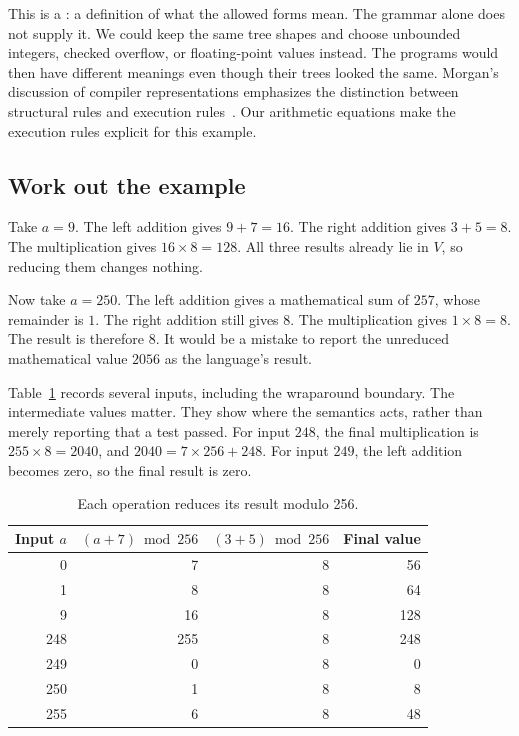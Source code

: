This is a : a definition of what the allowed forms mean.
The grammar alone does not supply it.
We could keep the same tree shapes and choose unbounded integers, checked overflow, or floating-point values instead.
The programs would then have different meanings even though their trees looked the same.
Morgan's discussion of compiler representations emphasizes the distinction between structural rules and execution rules~\cite[Chapter~4]{morgan-1998-optimizing}.
Our arithmetic equations make the execution rules explicit for this example.

\subsection{Work out the example}
\label{sec:tiny-worked-values}

Take $a=9$.
The left addition gives $9+7=16$.
The right addition gives $3+5=8$.
The multiplication gives $16\times8=128$.
All three results already lie in $V$, so reducing them changes nothing.

Now take $a=250$.
The left addition gives a mathematical sum of $257$, whose remainder is $1$.
The right addition still gives $8$.
The multiplication gives $1\times8=8$.
The result is therefore $8$.
It would be a mistake to report the unreduced mathematical value $2056$ as the language's result.

Table~\ref{tab:tiny-example-values} records several inputs, including the wraparound boundary.
The intermediate values matter.
They show where the semantics acts, rather than merely reporting that a test passed.
For input $248$, the final multiplication is $255\times8=2040$, and $2040=7\times256+248$.
For input $249$, the left addition becomes zero, so the final result is zero.

\begin{table}
  \centering
  \caption{Each operation reduces its result modulo 256.}
  \label{tab:tiny-example-values}
  \begin{tabular}{rrrr}
    \toprule
    Input $a$ & $(a+7)\bmod256$ & $(3+5)\bmod256$ & Final value \\
    \midrule
    0   & 7   & 8 & 56 \\
    1   & 8   & 8 & 64 \\
    9   & 16  & 8 & 128 \\
    248 & 255 & 8 & 248 \\
    249 & 0   & 8 & 0 \\
    250 & 1   & 8 & 8 \\
    255 & 6   & 8 & 48 \\
    \bottomrule
  \end{tabular}
\end{table}

